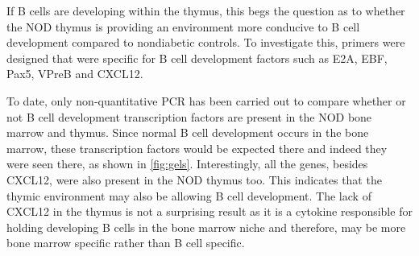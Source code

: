 If B cells are developing within the thymus, this begs the question as to whether the NOD thymus is providing an environment more conducive to B cell development compared to nondiabetic controls. 
To investigate this, primers were designed that were specific for B cell development factors such as E2A, EBF, Pax5, VPreB and CXCL12.

To date, only non-quantitative PCR has been carried out to compare whether or not B cell development transcription factors are present in the NOD bone marrow and thymus.
Since normal B cell development occurs in the bone marrow, these transcription factors would be expected there and indeed they were seen there, as shown in \cref{fig:gels}. 
Interestingly, all the genes, besides CXCL12, were also present in the NOD thymus too.
This indicates that the thymic environment may also be allowing B cell development.
The lack of CXCL12 in the thymus is not a surprising result as it is a cytokine responsible for holding developing B cells in the bone marrow niche and therefore, may be more bone marrow specific rather than B cell specific.


